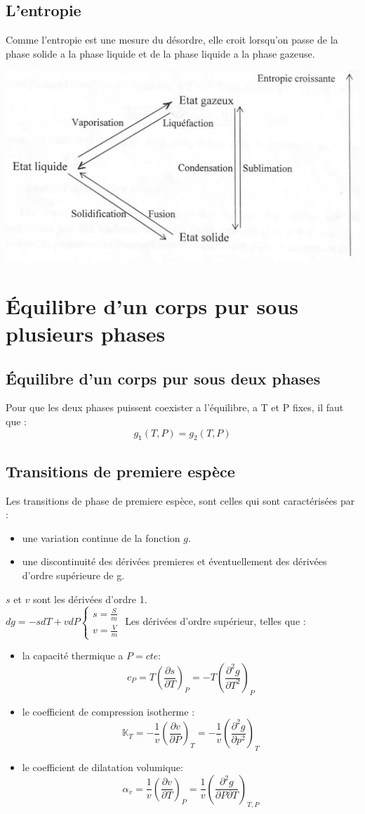\documentclass[12pt,oneside]{book}
\begin{document}
\subsection{L'entropie}
Comme l'entropie est une mesure du désordre, elle croit lorsqu'on passe de la phase solide a la phase liquide et de la phase liquide a la phase gazeuse.
\begin{center}
    \includegraphics[width=0.5\linewidth]{../pic/3300/12.png}
\end{center}
\section{Équilibre d'un corps pur sous plusieurs phases}   
\subsection{Équilibre d'un corps pur sous deux phases}
    Pour que les deux phases puissent coexister a l’équilibre, a T et P fixes, il faut que :
    \[ g_1(T,P) = g_2(T,P) \]
\subsection{Transitions de premiere espèce}
    Les transitions de phase de premiere espèce, sont celles qui sont caractérisées par :
    \begin{itemize}
        \item une variation continue de la fonction $g$.
        \item une discontinuité des dérivées premieres et éventuellement des dérivées d'ordre supérieure de g.
    \end{itemize}
    $s $ et $v$ sont les dérivées d'ordre 1.\\
    $dg = -sdT + vdP \begin{cases}
        s = \frac{S}{m}\\
        v = \frac{V}{m}
    \end{cases} $
    Les dérivées d'ordre supérieur, telles que :
    \begin{itemize}
        \item la capacité thermique a $P = cte$:
            \[c_P =T (\frac{\partial s}{\partial T})_P = - T (\frac{\partial^2 g}{\partial T^2})_P\]
        \item le coefficient de compression isotherme :
            \[\mathbb{K}_T = - \frac{1}{v}(\frac{\partial v}{\partial P})_T = -\frac{1}{v}(\frac{\partial^2g}{\partial p^2})_T\]
        \item le coefficient de dilatation volumique:
            \[\alpha_v = \frac{1}{v}(\frac{\partial v}{\partial T})_P = \frac{1}{v}(\frac{\partial^2 g}{\partial P\partial T})_{T,P}\]
    \end{itemize}
\end{document}
